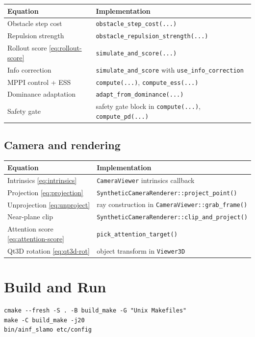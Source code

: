 \documentclass[a4paper, 11pt]{article}
\begin{document}
\begin{center}
\small
\begin{tabular}{p{7cm}p{7cm}}
  \toprule
  Equation & Implementation \\
  \midrule
  Obstacle step cost  & \texttt{obstacle\_step\_cost(...)} \\
  Repulsion strength  & \texttt{obstacle\_repulsion\_strength(...)} \\
  Rollout score \eqref{eq:rollout-score}
                      & \texttt{simulate\_and\_score(...)} \\
  Info correction     & \texttt{simulate\_and\_score} with \texttt{use\_info\_correction} \\
  MPPI control + ESS  & \texttt{compute(...)}, \texttt{compute\_ess(...)} \\
  Dominance adaptation & \texttt{adapt\_from\_dominance(...)} \\
  Safety gate         & safety gate block in \texttt{compute(...)}, \texttt{compute\_pd(...)} \\
  \bottomrule
\end{tabular}
\end{center}

\subsection{Camera and rendering}

\begin{center}
\small
\begin{tabular}{p{7cm}p{7cm}}
  \toprule
  Equation & Implementation \\
  \midrule
  Intrinsics \eqref{eq:intrinsics}
    & \texttt{CameraViewer} intrinsics callback \\
  Projection \eqref{eq:projection}
    & \texttt{SyntheticCameraRenderer::project\_point()} \\
  Unprojection \eqref{eq:unproject}
    & ray construction in \texttt{CameraViewer::grab\_frame()} \\
  Near-plane clip
    & \texttt{SyntheticCameraRenderer::clip\_and\_project()} \\
  Attention score \eqref{eq:attention-score}
    & \texttt{pick\_attention\_target()} \\
  Qt3D rotation \eqref{eq:qt3d-rot}
    & object transform in \texttt{Viewer3D} \\
  \bottomrule
\end{tabular}
\end{center}

\appendix
\section{Build and Run}

\begin{lstlisting}
cmake --fresh -S . -B build_make -G "Unix Makefiles"
make -C build_make -j20
bin/ainf_slamo etc/config
\end{lstlisting}
\end{document}
